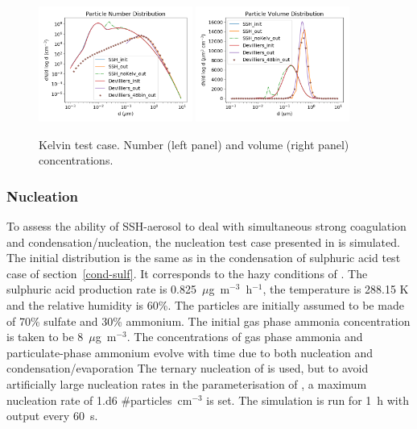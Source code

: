 \documentclass[a4paper,11pt]{article}
\begin{document}
\begin{figure}[H]
        \begin{center}
                \includegraphics[angle=0,width=0.45\textwidth]{../graph/figure_ref/dNdlogd_KELVIN.png}
                \includegraphics[angle=0,width=0.45\textwidth]{../graph/figure_ref/dVdlogd_KELVIN.png}
        \end{center}
\caption{Kelvin test case. Number (left panel) and volume (right panel) concentrations.}
\label{fig-kelvin}
\end{figure}
       
\subsubsection{Nucleation}

To assess the ability of SSH-aerosol to deal with simultaneous strong coagulation and condensation/nucleation, the nucleation test case presented in \cite{sartelet2006} is simulated. The initial distribution is the same as in the condensation of sulphuric acid test case of section~\ref{cond-sulf}. It corresponds to the hazy conditions of \cite{seigneur1986simulation}. The sulphuric
acid production rate is 0.825~$\mu$g~m$^{-3}$~h$^{-1}$,
the temperature is 288.15 K and the relative humidity is 60\%. The particles are initially assumed to be made of 70\% sulfate and 30\% ammonium. The initial gas phase ammonia concentration is taken to be 8~$\mu$g~m$^{-3}$. The concentrations of gas phase ammonia and particulate-phase ammonium evolve with time due to both nucleation and condensation/evaporation
The ternary nucleation of \cite{napari} is used, but to avoid artificially large nucleation rates in the parameterisation of \cite{napari}, a maximum nucleation rate of 1.d6 \#particles~cm$^{-3}$ is set.
The simulation is run for 1~h with output every 60~s.
\end{document}
